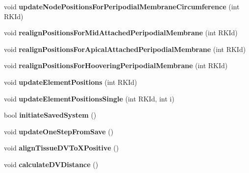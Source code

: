 \begin{DoxyCompactItemize}
\item 
\hypertarget{classSimulation_a0d4c487602899fb2a6bd8ef2cfef2f85}{}void {\bfseries update\+Node\+Positions\+For\+Peripodial\+Membrane\+Circumference} (int R\+K\+Id)\label{classSimulation_a0d4c487602899fb2a6bd8ef2cfef2f85}

\item 
\hypertarget{classSimulation_a8e8865c7b7de229e04766466273342bc}{}void {\bfseries realign\+Positions\+For\+Mid\+Attached\+Peripodial\+Membrane} (int R\+K\+Id)\label{classSimulation_a8e8865c7b7de229e04766466273342bc}

\item 
\hypertarget{classSimulation_a4270a35735a8dd12a7a2085181e164fb}{}void {\bfseries realign\+Positions\+For\+Apical\+Attached\+Peripodial\+Membrane} (int R\+K\+Id)\label{classSimulation_a4270a35735a8dd12a7a2085181e164fb}

\item 
\hypertarget{classSimulation_a50d1fb2839bbf2c0a6d563b2d5d01f4e}{}void {\bfseries realign\+Positions\+For\+Hoovering\+Peripodial\+Membrane} (int R\+K\+Id)\label{classSimulation_a50d1fb2839bbf2c0a6d563b2d5d01f4e}

\item 
\hypertarget{classSimulation_a73aeedfc61d7edda6a2999eff57990d6}{}void {\bfseries update\+Element\+Positions} (int R\+K\+Id)\label{classSimulation_a73aeedfc61d7edda6a2999eff57990d6}

\item 
\hypertarget{classSimulation_ac82de4f0b4cda6575e1258068fe3cd42}{}void {\bfseries update\+Element\+Positions\+Single} (int R\+K\+Id, int i)\label{classSimulation_ac82de4f0b4cda6575e1258068fe3cd42}

\item 
\hypertarget{classSimulation_a6ef90fd76ed4f6bb9d063e7e72e9a983}{}bool {\bfseries initiate\+Saved\+System} ()\label{classSimulation_a6ef90fd76ed4f6bb9d063e7e72e9a983}

\item 
\hypertarget{classSimulation_a1f5dbbde572af555225089e247296e2e}{}void {\bfseries update\+One\+Step\+From\+Save} ()\label{classSimulation_a1f5dbbde572af555225089e247296e2e}

\item 
\hypertarget{classSimulation_a91a12f6ac1b230cecbe004221326a7ca}{}void {\bfseries align\+Tissue\+D\+V\+To\+X\+Positive} ()\label{classSimulation_a91a12f6ac1b230cecbe004221326a7ca}

\item 
\hypertarget{classSimulation_a2cdf77d01390a32cabb8ba7535a9f7dd}{}void {\bfseries calculate\+D\+V\+Distance} ()\label{classSimulation_a2cdf77d01390a32cabb8ba7535a9f7dd}


\end{DoxyCompactItemize}
